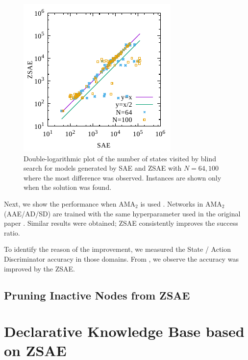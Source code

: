 \begin{figure}[htb]
 \centering
 \includegraphics{img/static/gen.pdf}
 \caption{Double-logarithmic plot of the number of states visited by blind search
for models generated by SAE and ZSAE with $N=64,100$ where the most difference was observed.
 Instances are shown only when the solution was found.}
 \label{fig:ama1-visited}
\end{figure}


Next, we show the performance when AMA$_2$ is used
. Networks in AMA$_2$ (AAE/AD/SD) are trained with the same hyperparameter 
used in the original paper \cite{Asai2018}.
Similar results were obtained; ZSAE consistently improves the success ratio.

\begin{table}[htb]
 \vspace{2in}
 \caption{}
 \label{tab:ama2}
\end{table}

To identify the reason of the improvement, we measured the State / Action Discriminator accuracy in those domains.
From , we observe the accuracy was improved by the ZSAE.

\begin{figure}[htb]
 \vspace{2in}
 \caption{}
 \label{fig:ama2-ad}
\end{figure}

\subsection{Pruning Inactive Nodes from ZSAE}

\section{Declarative Knowledge Base based on ZSAE}

